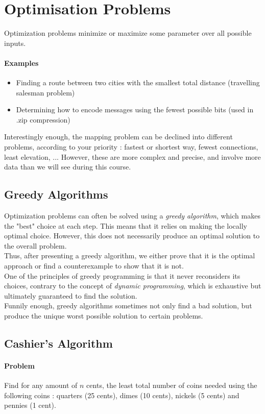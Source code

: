 \documentclass[10pt,a4paper]{book}
\newcommand{\ind}{\hspace*{\parindent}}
\begin{document}
\section{Optimisation Problems}
Optimization problems minimize or maximize some parameter over all possible inputs. 
\paragraph*{Examples}
\begin{itemize}
\item Finding a route between two cities with the smallest total distance (travelling salesman problem)
\item Determining how to encode messages using the fewest possible bits (used in .zip compression)
\end{itemize}
Interestingly enough, the mapping problem can be declined into different problems, according to your priority : fastest or shortest way, fewest connections, least elevation, ... However, these are more complex and precise, and involve more data than we will see during this course.

\subsection{Greedy Algorithms}
\ind Optimization problems can often be solved using a \textit{greedy algorithm}, which makes the "best" choice at each step. This means that it relies on making the locally optimal choice. However, this does not necessarily produce an optimal solution to the overall problem.\\
\ind Thus, after presenting a greedy algorithm, we either prove that it is the optimal approach or find a counterexample to show that it is not.\\
\ind One of the principles of greedy programming is that it never reconsiders its choices, contrary to the concept of \textit{dynamic programming}, which is exhaustive but ultimately guaranteed to find the solution.\\
\ind Funnily enough, greedy algorithms sometimes not only find a bad solution, but produce the unique worst possible solution to certain problems.

\subsection{Cashier's Algorithm}
\paragraph*{Problem}
Find for any amount of $n$ cents, the least total number of coins needed using the following coins : quarters (25 cents), dimes (10 cents), nickels (5 cents) and pennies (1 cent).
\end{document}
